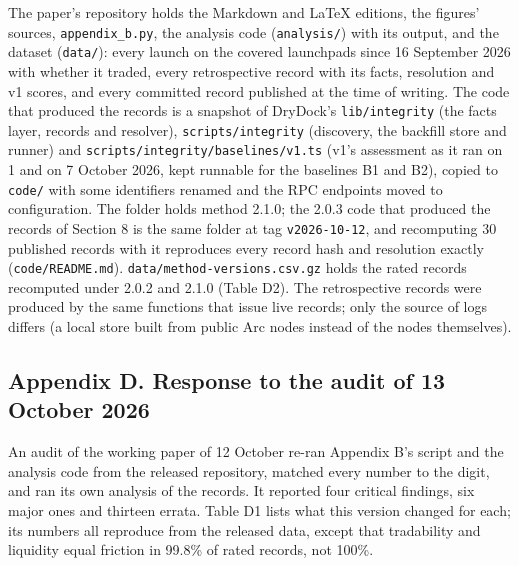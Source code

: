 The paper's repository holds the Markdown and LaTeX editions, the figures' sources, \texttt{appendix\_b.py}, the analysis code (\texttt{analysis/}) with its output, and the dataset (\texttt{data/}): every launch on the covered launchpads since 16 September 2026 with whether it traded, every retrospective record with its facts, resolution and v1 scores, and every committed record published at the time of writing. The code that produced the records is a snapshot of DryDock's \texttt{lib/integrity} (the facts layer, records and resolver), \texttt{scripts/integrity} (discovery, the backfill store and runner) and \texttt{scripts/integrity/baselines/v1.ts} (v1's assessment as it ran on 1 and on 7 October 2026, kept runnable for the baselines B1 and B2), copied to \texttt{code/} with some identifiers renamed and the RPC endpoints moved to configuration. The folder holds method 2.1.0; the 2.0.3 code that produced the records of Section 8 is the same folder at tag \texttt{v2026-10-12}, and recomputing 30 published records with it reproduces every record hash and resolution exactly (\texttt{code/README.md}). \texttt{data/method-versions.csv.gz} holds the rated records recomputed under 2.0.2 and 2.1.0 (Table D2). The retrospective records were produced by the same functions that issue live records; only the source of logs differs (a local store built from public Arc nodes instead of the nodes themselves).

\subsection{Appendix D. Response to the audit of 13 October 2026}\label{appendix-d.-response-to-the-audit-of-13-october-2026}

An audit of the working paper of 12 October re-ran Appendix B's script and the analysis code from the released repository, matched every number to the digit, and ran its own analysis of the records. It reported four critical findings, six major ones and thirteen errata. Table D1 lists what this version changed for each; its numbers all reproduce from the released data, except that tradability and liquidity equal friction in 99.8\% of rated records, not 100\%.

